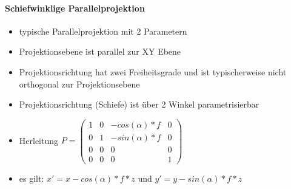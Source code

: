 \documentclass[10pt,landscape]{article}
\begin{document}
\begin{multicols}{3}
  \paragraph{Schiefwinklige Parallelprojektion}
  \begin{itemize}
    \item typische Parallelprojektion mit 2 Parametern
    \item Projektionsebene ist parallel zur XY Ebene
    \item Projektionsrichtung hat zwei Freiheitsgrade und ist typischerweise nicht orthogonal zur Projektionsebene
    \item Projektionsrichtung (Schiefe) ist über 2 Winkel parametrisierbar
    \item Herleitung $P=\begin{pmatrix}
              1 & 0 & -cos(\alpha)*f & 0  \\
              0 & 1 & -sin(\alpha)*f & 0  \\
              0 & 0 & 0              & 0  \\
              0 & 0 & 0              & 1 
            \end{pmatrix}$
    \item es gilt: $x'=x-cos(\alpha)*f*z$ und $y'=y-sin(\alpha)*f*z$
  \end{itemize}
  

\end{multicols}
\end{document}
